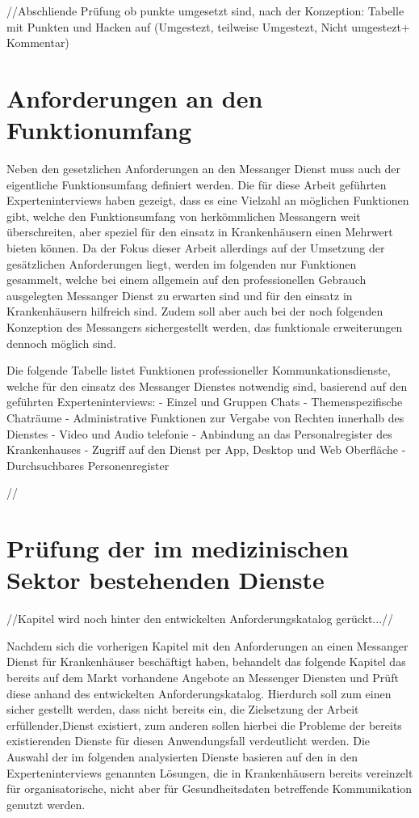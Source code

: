 //Abschliende Prüfung ob punkte umgesetzt sind, nach der Konzeption:
Tabelle mit Punkten und Hacken auf (Umgestezt, teilweise Umgestezt, Nicht umgestezt+ Kommentar)

\section{Anforderungen an den Funktionumfang}\label{section:pdimsbd}
Neben den gesetzlichen Anforderungen an den Messanger Dienst muss auch der eigentliche Funktionsumfang definiert werden. Die für diese Arbeit geführten Experteninterviews haben gezeigt, dass es eine Vielzahl an möglichen Funktionen gibt, welche den Funktionsumfang von herkömmlichen Messangern weit überschreiten, aber speziel für den einsatz in Krankenhäusern einen Mehrwert bieten können.
Da der Fokus dieser Arbeit allerdings auf der Umsetzung der gesätzlichen Anforderungen liegt, werden im folgenden nur Funktionen gesammelt, welche bei einem allgemein auf den professionellen Gebrauch ausgelegten Messanger Dienst zu erwarten sind und für den einsatz in Krankenhäusern hilfreich sind. Zudem soll aber auch bei der noch folgenden Konzeption des Messangers sichergestellt werden, das funktionale erweiterungen dennoch möglich sind.

Die folgende Tabelle listet Funktionen professioneller Kommunkationsdienste, welche für den einsatz des Messanger Dienstes notwendig sind, basierend auf den geführten Experteninterviews:
- Einzel und Gruppen Chats 
- Themenspezifische Chaträume
- Administrative Funktionen zur Vergabe von Rechten innerhalb des Dienstes 
- Video und Audio telefonie
- Anbindung an das Personalregister des Krankenhauses
- Zugriff auf den Dienst per App, Desktop und Web Oberfläche
- Durchsuchbares Personenregister 

//

\section{Prüfung der im medizinischen Sektor bestehenden Dienste}\label{section:pdimsbd}
//Kapitel wird noch hinter den entwickelten Anforderungskatalog gerückt...// 

Nachdem sich die vorherigen Kapitel mit den Anforderungen an einen Messanger Dienst für Krankenhäuser beschäftigt haben, behandelt das folgende Kapitel das bereits auf dem Markt vorhandene Angebote an Messenger Diensten und Prüft diese anhand des entwickelten Anforderungskatalog. Hierdurch soll zum einen sicher gestellt werden, dass nicht bereits ein, die Zielsetzung der Arbeit erfüllender,Dienst existiert, zum anderen sollen hierbei die Probleme der bereits existierenden Dienste für diesen Anwendungsfall verdeutlicht werden. Die Auswahl der im folgenden analysierten Dienste basieren auf den in den Experteninterviews genannten Lösungen, die in Krankenhäusern bereits vereinzelt für organisatorische, nicht aber für Gesundheitsdaten betreffende Kommunikation genutzt werden.

